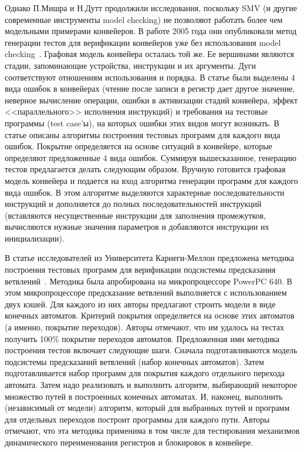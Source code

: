 \documentclass[14pt]{extreport}
\begin{document}
Однако П.Мишра и Н.Дутт продолжили исследования, поскольку SMV (и другие современные инструменты model checking) не позволяют работать более чем модельными примерами конвейеров. В работе 2005 года они опубликовали метод генерации тестов для верификации конвейеров уже без использования model checking~\cite{MishraDutt05}. Графовая модель конвейера осталась той же. Ее вершинами являются стадии, запоминающие устройства, инструкции и их аргументы. Дуги соответствуют отношениям использования и порядка. В статье были выделены 4 вида ошибок в конвейерах (чтение после записи в регистр дает другое значение, неверное вычисление операции, ошибки в активизации стадий конвейера, эффект <<параллельного>> исполнения инструкций) и требования на тестовые программы (test case'ы), на которых ошибки этих видов могут возникать. В статье описаны алгоритмы построения тестовых программ для каждого вида ошибок. Покрытие определяется на основе ситуаций в конвейере, которые определяют предложенные 4 вида ошибок. Суммируя вышесказанное, генерацию тестов предлагается делать следующим образом. Вручную готовится графовая модель конвейера и подается на вход алгоритма генерации программ для каждого вида ошибок. В этом алгоритме выделяются характерные последовательности инструкций и  дополняется до полных последовательностей инструкций (вставляются несущественные инструкции для заполнения промежутков, вычисляются нужные значения параметров и добавляются инструкции их инициализации).

В статье исследователей из Университета Карнеги-Меллон предложена методика построения тестовых программ для верификации подсистемы предсказания ветвлений~\cite{Branches99}. Методика была апробирована на микропроцессоре PowerPC 640. В этом микропроцессоре предсказание ветвлений выполняется с использованием двух кэшей. Для каждого из них авторы предлагают строить модели в виде конечных автоматов. Критерий покрытия определяется на основе этих автоматов (а именно, покрытие переходов). Авторы отмечают, что им удалось на тестах получить 100\% покрытие переходов автоматов. Предложенная ими методика построения тестов включает следующие шаги. Сначала подготавливаются модель подсистемы предсказаний ветвлений (набор конечных автоматов). Затем подготавливается набор программ для покрытия каждого отдельного перехода автомата. Затем надо реализовать и выполнить алгоритм, выбирающий некоторое множество путей в построенных конечных автоматах. И, наконец, выполнить (независимый от модели) алгоритм, который для выбранных путей и программ для отдельных переходов построит программы для каждого пути. Авторы отмечают, что эта методика применима в том числе для тестирования механизмов динамического переименования регистров и блокировок в конвейере.
\end{document}
